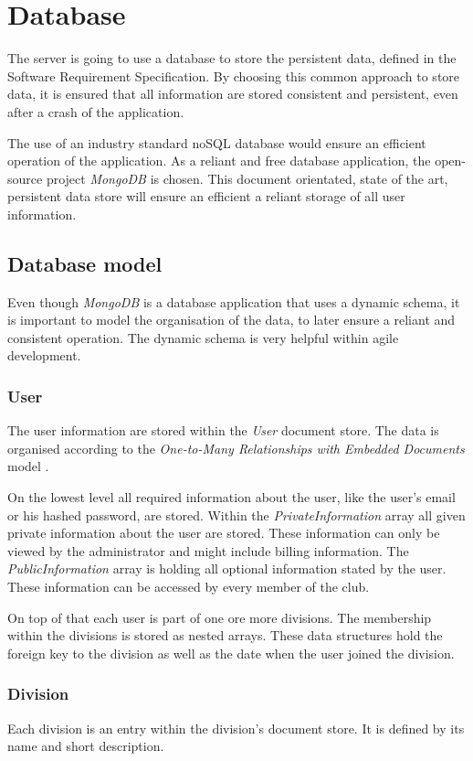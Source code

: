 \chapter{Database}
The server is going to use a database to store the persistent data, defined in the Software Requirement Specification. By choosing this common approach to store data, it is ensured that all information are stored consistent and persistent, even after a crash of the application.

The use of an industry standard noSQL database would ensure an efficient operation of the application. As a reliant and free database application, the open-source project \emph{MongoDB} is chosen. This document orientated, state of the art, persistent data store will ensure an efficient a reliant storage of all user information.

\section{Database model}
Even though \emph{MongoDB} is a database application that uses a dynamic schema, it is important to model the organisation of the data, to later ensure a reliant and consistent operation. The dynamic schema is very helpful within agile development.

\subsection{User}
The user information are stored within the \emph{User} document store. The data is organised according to the \emph{One-to-Many Relationships with Embedded Documents} model \cite[p. 141]{Mongo:2014aa}.

On the lowest level all required information about the user, like the user's email or his hashed password, are stored. Within the \emph{PrivateInformation} array all given private information about the user are stored. These information can only be viewed by the administrator and might include billing information. The \emph{PublicInformation} array is holding all optional information stated by the user. These information can be accessed by every member of the club.

On top of that each user is part of one ore more divisions. The membership within the divisions is stored as nested arrays. These data structures hold the foreign key to the division as well as the date when the user joined the division.

\subsection{Division}
Each division is an entry within the division's document store. It is defined by its name and short description.

